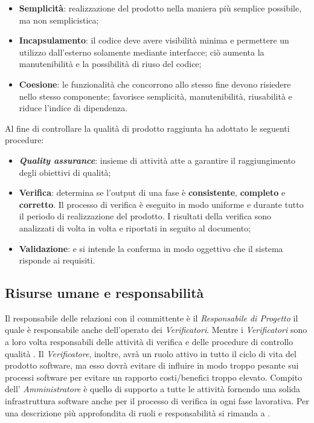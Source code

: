 \begin{itemize}
\item \textbf{Semplicità}: realizzazione del prodotto nella maniera più semplice possibile, ma non semplicistica;
\item \textbf{Incapsulamento}: il codice deve avere visibilità minima e permettere un utilizzo dall’esterno solamente mediante interfacce; ciò aumenta la manutenibilità e la possibilità di riuso del codice;
\item \textbf{Coesione}: le funzionalità che concorrono allo stesso fine devono risiedere nello stesso componente; favorisce semplicità, manutenibilità, riusabilità e riduce l’indice di dipendenza.
\end{itemize}
Al fine di controllare la qualità di prodotto raggiunta \gruppo ha adottato le seguenti procedure:
\begin{itemize}
\item \textbf{\textit{Quality assurance}}: insieme di attività atte a garantire il raggiungimento degli obiettivi di qualità;
\item \textbf{Verifica}: determina se l'output di una fase è \textbf{consistente}, \textbf{completo} e \textbf{corretto}. Il processo di verifica è eseguito in modo uniforme e durante tutto il periodo di realizzazione del prodotto. I risultati della verifica sono analizzati di volta in volta e riportati in seguito al documento;
\item \textbf{Validazione}: e si intende la conferma in modo oggettivo che il sistema risponde ai requisiti.
\end{itemize}
\subsection{Risurse umane e responsabilità}
Il responsabile delle relazioni con il committente è il \textit{Responsabile di Progetto} il quale è responsabile anche dell'operato dei \textit{Verificatori}. Mentre i \textit{Verificatori} sono a loro volta responsabili delle attività di verifica e delle procedure di controllo qualità . Il \textit{Verificatore}, inoltre, avrà un ruolo attivo in tutto il ciclo di vita del prodotto software, ma esso dovrà evitare di influire in modo troppo pesante sui processi software per evitare un rapporto costi/benefici troppo elevato. Compito dell' \textit{Amministratore} è quello di supporto a tutte le attività fornendo una solida infrastruttura software anche per il processo di verifica in ogni fase lavorativa.
Per una descrizione più approfondita di ruoli e responsabilità si rimanda a \infoNDP.\\
